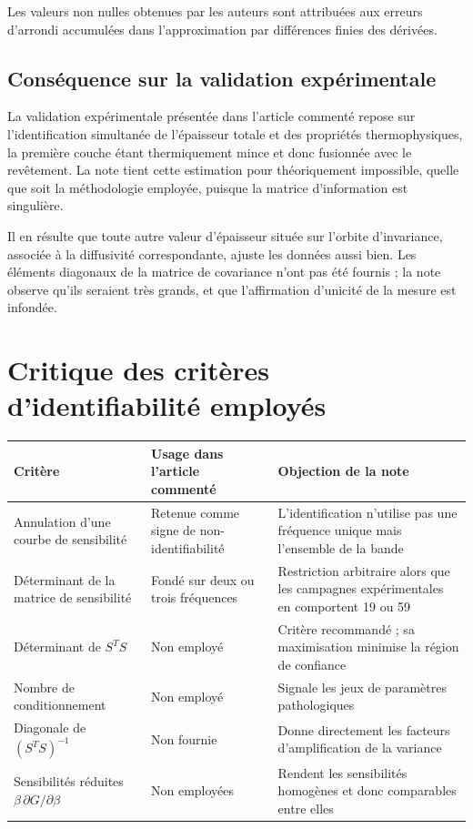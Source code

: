 \documentclass[11pt,a4paper]{article}
\begin{document}
Les valeurs non nulles obtenues par les auteurs sont attribuées aux erreurs d'arrondi accumulées dans
l'approximation par différences finies des dérivées.

\subsection{Conséquence sur la validation expérimentale}

La validation expérimentale présentée dans l'article commenté repose sur l'identification simultanée de
l'épaisseur totale et des propriétés thermophysiques, la première couche étant thermiquement mince et
donc fusionnée avec le revêtement. La note tient cette estimation pour théoriquement impossible, quelle
que soit la méthodologie employée, puisque la matrice d'information est singulière.

Il en résulte que toute autre valeur d'épaisseur située sur l'orbite d'invariance, associée à la
diffusivité correspondante, ajuste les données aussi bien. Les éléments diagonaux de la matrice de
covariance n'ont pas été fournis ; la note observe qu'ils seraient très grands, et que l'affirmation
d'unicité de la mesure est infondée.

\section{Critique des critères d'identifiabilité employés}

\begin{center}
\begin{tabularx}{\textwidth}{@{}lXX@{}}
\toprule
\textbf{Critère} & \textbf{Usage dans l'article commenté} & \textbf{Objection de la note} \\
\midrule
Annulation d'une courbe de sensibilité & Retenue comme signe de non-iden\-ti\-fia\-bi\-li\-té &
L'identification n'utilise pas une fréquence unique mais l'ensemble de la bande \\
\addlinespace
Déterminant de la matrice de sensibilité & Fondé sur deux ou trois fréquences &
Restriction arbitraire alors que les campagnes expérimentales en comportent 19 ou 59 \\
\addlinespace
Déterminant de $S^{T}S$ & Non employé & Critère recommandé ; sa maximisation minimise la région de
confiance \\
\addlinespace
Nombre de conditionnement & Non employé & Signale les jeux de paramètres pathologiques \\
\addlinespace
Diagonale de $\left(S^{T}S\right)^{-1}$ & Non fournie & Donne directement les facteurs d'amplification
de la variance \\
\addlinespace
Sensibilités réduites $\beta\,\partial G/\partial\beta$ & Non employées & Rendent les sensibilités
homogènes et donc comparables entre elles \\
\bottomrule
\end{tabularx}
\end{center}
\end{document}
